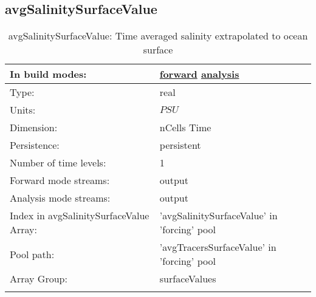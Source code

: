 \subsection[avgSalinitySurfaceValue]{avgSalinitySurfaceValue}
\label{subsec:var_sec_forcing_avgSalinitySurfaceValue}
\begin{center}
\begin{longtable}{| p{2.0in} | p{4.0in} |}
        \hline 
        In build modes: & \hyperref[subsec:forward_var_tab_forcing]{forward} \hyperref[subsec:analysis_var_tab_forcing]{analysis} \\
        \hline 
        Type: & real \\
        \hline 
        Units: & $PSU$ \\
        \hline 
        Dimension: & nCells Time \\
        \hline 
        Persistence: & persistent \\
        \hline 
        Number of time levels: & 1 \\
        \hline 
		 Forward mode streams: &  output \\
        \hline 
		 Analysis mode streams: &  output \\
        \hline 
		 Index in avgSalinitySurfaceValue Array: & 'avgSalinitySurfaceValue' in 'forcing' pool \\
		 \hline 
            Pool path: & 'avgTracersSurfaceValue' in 'forcing' pool
 \\
		 \hline 
		 Array Group: & surfaceValues \\
		 \hline 
    \caption{avgSalinitySurfaceValue: Time averaged salinity extrapolated to ocean surface}
\end{longtable}
\end{center}
